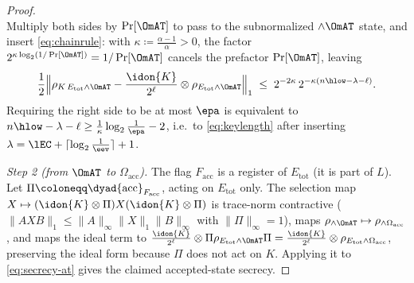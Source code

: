 \begin{proof}
\begin{equation*}
\end{equation*}
Multiply both sides by $\Pr[\OmAT]$ to pass to the subnormalized
$\wedge\OmAT$ state, and insert \eqref{eq:chainrule}: with
$\kappa\coloneqq\frac{\alpha-1}{\alpha}>0$, the factor
$2^{\kappa\log_2(1/\Pr[\OmAT])}=1/\Pr[\OmAT]$ cancels the prefactor
$\Pr[\OmAT]$, leaving
\begin{equation}\label{eq:secrecy-at}
  \frac12\Big\|\rho_{K\,E_{\mathrm{tot}}\wedge\OmAT}
  -\frac{\idon{K}}{2^{\ell}}\otimes
  \rho_{E_{\mathrm{tot}}\wedge\OmAT}\Big\|_1
  \;\le\;2^{-2\kappa}\,2^{-\kappa\left(n\hlow-\lambda-\ell\right)} .
\end{equation}
Requiring the right side to be at most $\epa$ is equivalent to
$n\hlow-\lambda-\ell\ge\frac1{\kappa}\log_2\frac1{\epa}-2$, i.e.\ to
\eqref{eq:keylength} after inserting
$\lambda=\lEC+\lceil\log_2\frac1{\eev}\rceil+1$.

\emph{Step 2 (from $\OmAT$ to $\Omega_{\mathrm{acc}}$).} The flag
$F_{\mathrm{acc}}$ is a register of $E_{\mathrm{tot}}$ (it is part of
$L$). Let $\Pi\coloneqq\dyad{\mathrm{acc}}_{F_{\mathrm{acc}}}$, acting on
$E_{\mathrm{tot}}$ only. The selection map
$X\mapsto(\idon{K}\otimes\Pi)X(\idon{K}\otimes\Pi)$ is trace-norm
contractive ($\|AXB\|_1\le\|A\|_{\infty}\|X\|_1\|B\|_{\infty}$ with
$\|\Pi\|_{\infty}=1$), maps
$\rho_{\wedge\OmAT}\mapsto\rho_{\wedge\Omega_{\mathrm{acc}}}$, and maps
the ideal term to
$\frac{\idon{K}}{2^{\ell}}\otimes
\Pi\rho_{E_{\mathrm{tot}}\wedge\OmAT}\Pi
=\frac{\idon{K}}{2^{\ell}}\otimes
\rho_{E_{\mathrm{tot}}\wedge\Omega_{\mathrm{acc}}}$, preserving the ideal
form because $\Pi$ does not act on $K$. Applying it to
\eqref{eq:secrecy-at} gives the claimed accepted-state secrecy.
\end{proof}
